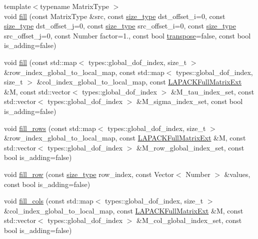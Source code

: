 \begin{DoxyCompactItemize}
\item 
{\footnotesize template$<$typename Matrix\+Type $>$ }\\void \hyperlink{classLAPACKFullMatrixExt_ada3ff3d40049aca2c4d554baa701d613}{fill} (const Matrix\+Type \&src, const \hyperlink{classLAPACKFullMatrixExt_a5cf5f4a6104dc17029210b5ca52bf574}{size\+\_\+type} dst\+\_\+offset\+\_\+i=0, const \hyperlink{classLAPACKFullMatrixExt_a5cf5f4a6104dc17029210b5ca52bf574}{size\+\_\+type} dst\+\_\+offset\+\_\+j=0, const \hyperlink{classLAPACKFullMatrixExt_a5cf5f4a6104dc17029210b5ca52bf574}{size\+\_\+type} src\+\_\+offset\+\_\+i=0, const \hyperlink{classLAPACKFullMatrixExt_a5cf5f4a6104dc17029210b5ca52bf574}{size\+\_\+type} src\+\_\+offset\+\_\+j=0, const Number factor=1., const bool \hyperlink{classLAPACKFullMatrixExt_ac46d71bc1b0288fce7ad44b222e9210b}{transpose}=false, const bool is\+\_\+adding=false)
\item 
void \hyperlink{classLAPACKFullMatrixExt_a3f0dffff13babd0b952a821b5f1f23c9}{fill} (const std\+::map$<$ types\+::global\+\_\+dof\+\_\+index, size\+\_\+t $>$ \&row\+\_\+index\+\_\+global\+\_\+to\+\_\+local\+\_\+map, const std\+::map$<$ types\+::global\+\_\+dof\+\_\+index, size\+\_\+t $>$ \&col\+\_\+index\+\_\+global\+\_\+to\+\_\+local\+\_\+map, const \hyperlink{classLAPACKFullMatrixExt}{L\+A\+P\+A\+C\+K\+Full\+Matrix\+Ext} \&M, const std\+::vector$<$ types\+::global\+\_\+dof\+\_\+index $>$ \&M\+\_\+tau\+\_\+index\+\_\+set, const std\+::vector$<$ types\+::global\+\_\+dof\+\_\+index $>$ \&M\+\_\+sigma\+\_\+index\+\_\+set, const bool is\+\_\+adding=false)
\item 
void \hyperlink{classLAPACKFullMatrixExt_a73e9ad59ab56c377edc852d8ba16995c}{fill\+\_\+rows} (const std\+::map$<$ types\+::global\+\_\+dof\+\_\+index, size\+\_\+t $>$ \&row\+\_\+index\+\_\+global\+\_\+to\+\_\+local\+\_\+map, const \hyperlink{classLAPACKFullMatrixExt}{L\+A\+P\+A\+C\+K\+Full\+Matrix\+Ext} \&M, const std\+::vector$<$ types\+::global\+\_\+dof\+\_\+index $>$ \&M\+\_\+row\+\_\+global\+\_\+index\+\_\+set, const bool is\+\_\+adding=false)
\item 
void \hyperlink{classLAPACKFullMatrixExt_a74d566120461e1a2437b9fd9a070633f}{fill\+\_\+row} (const \hyperlink{classLAPACKFullMatrixExt_a5cf5f4a6104dc17029210b5ca52bf574}{size\+\_\+type} row\+\_\+index, const Vector$<$ Number $>$ \&values, const bool is\+\_\+adding=false)
\item 
void \hyperlink{classLAPACKFullMatrixExt_af988edbf2f192f0eddf542178755eb91}{fill\+\_\+cols} (const std\+::map$<$ types\+::global\+\_\+dof\+\_\+index, size\+\_\+t $>$ \&col\+\_\+index\+\_\+global\+\_\+to\+\_\+local\+\_\+map, const \hyperlink{classLAPACKFullMatrixExt}{L\+A\+P\+A\+C\+K\+Full\+Matrix\+Ext} \&M, const std\+::vector$<$ types\+::global\+\_\+dof\+\_\+index $>$ \&M\+\_\+col\+\_\+global\+\_\+index\+\_\+set, const bool is\+\_\+adding=false)

\end{DoxyCompactItemize}
